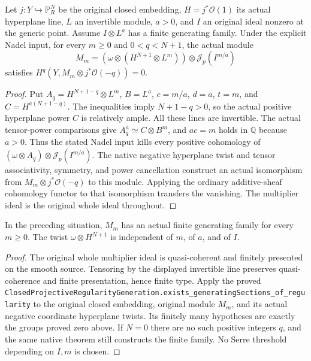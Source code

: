 \begin{proposition}
\label{prop:c0n-ordinary-uniform-regularity}
\leanok
Let $j:Y\hookrightarrow\mathbb P^N_R$ be the original closed embedding,
$H=j^*\mathcal O(1)$ its actual hyperplane line, $L$ an invertible
module, $a>0$, and $I$ an original ideal nonzero at the generic point.
Assume $I\otimes L^a$ has a finite generating family.  Under the explicit
Nadel input, for every $m\geq0$ and $0<q<N+1$, the actual module
\[
 M_m=(\omega\otimes(H^{N+1}\otimes L^m))
               \otimes\mathcal J_p(I^{m/a})
\]
satisfies $H^q(Y,M_m\otimes j^*\mathcal O(-q))=0$.
\end{proposition}
\begin{proof}
Put $A_q=H^{N+1-q}\otimes L^m$, $B=L^a$, $c=m/a$, $d=a$, $t=m$,
and $C=H^{a(N+1-q)}$.  The inequalities imply $N+1-q>0$, so the
actual positive hyperplane power $C$ is relatively ample.  All these
lines are invertible.  The actual tensor-power comparisons give
$A_q^a\simeq C\otimes B^m$, and $ac=m$ holds in $\mathbb Q$ because
$a>0$.  Thus the stated Nadel input kills every positive cohomology
of $(\omega\otimes A_q)\otimes\mathcal J_p(I^{m/a})$.
The native negative hyperplane twist and tensor associativity, symmetry,
and power cancellation construct an actual isomorphism from
$M_m\otimes j^*\mathcal O(-q)$ to this module.  Applying the ordinary
additive-sheaf cohomology functor to that isomorphism transfers the
vanishing.  The multiplier ideal is the original whole ideal throughout.
\end{proof}

\begin{proposition}
\label{prop:c0n-uniform-canonical-generators}
\leanok
In the preceding situation, $M_m$ has an actual finite generating family
for every $m\geq0$.  The twist $\omega\otimes H^{N+1}$ is independent
of $m$, of $a$, and of $I$.
\end{proposition}
\begin{proof}
The original whole multiplier ideal is quasi-coherent and finitely
presented on the smooth source.  Tensoring by the displayed invertible
line preserves quasi-coherence and finite presentation, hence finite
type.  Apply the proved
\nolinkurl{ClosedProjectiveRegularityGeneration.exists_generatingSections_of_regularity}
to the original closed embedding, original module $M_m$, and its
actual negative coordinate hyperplane twists.  Its finitely many
hypotheses are exactly the groups proved zero above.  If $N=0$ there
are no such positive integers $q$, and the same native theorem still
constructs the finite family.  No Serre threshold depending on $I,m$
is chosen.
\end{proof}

